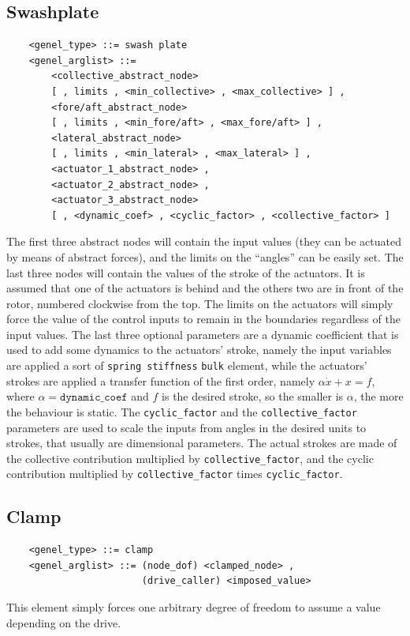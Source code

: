 \subsection{Swashplate}
\begin{verbatim}
    <genel_type> ::= swash plate
    <genel_arglist> ::=
        <collective_abstract_node> 
        [ , limits , <min_collective> , <max_collective> ] ,
        <fore/aft_abstract_node> 
        [ , limits , <min_fore/aft> , <max_fore/aft> ] ,
        <lateral_abstract_node> 
        [ , limits , <min_lateral> , <max_lateral> ] ,
        <actuator_1_abstract_node> ,
        <actuator_2_abstract_node> ,
        <actuator_3_abstract_node> 
        [ , <dynamic_coef> , <cyclic_factor> , <collective_factor> ]
\end{verbatim}
The first three abstract nodes will contain the input values (they can be
actuated by means of abstract forces), and the limits on the ``angles'' can
be easily set. 
The last three nodes will contain the values of the stroke of the actuators.
It is assumed that one of the actuators is behind and the others two are in
front of the rotor, numbered clockwise from the top. 
The limits on the actuators will simply force the value of the control
inputs to remain in the boundaries regardless of the input values.
The last three optional parameters are a dynamic coefficient that is used to
add some dynamics to the actuators' stroke, namely the input variables are
applied a sort of \texttt{spring stiffness} \texttt{bulk} element, while the
actuators' strokes are applied a transfer function of the first order, namely
$ \alpha\dot{x}+x=f $, where $ \alpha=\texttt{dynamic\_coef} $ and $ f $ is
the desired stroke, so the smaller is $ \alpha $, the more the behaviour is
static.
The \texttt{cyclic\_factor} and the \texttt{collective\_factor} parameters are
used to scale the inputs from angles in the desired units to strokes, that
usually are dimensional parameters. The actual strokes are made of the
collective contribution multiplied by \texttt{collective\_factor}, and the
cyclic contribution multiplied by \texttt{collective\_factor} times 
\texttt{cyclic\_factor}.
   
\subsection{Clamp}
\begin{verbatim}
    <genel_type> ::= clamp
    <genel_arglist> ::= (node_dof) <clamped_node> ,
                        (drive_caller) <imposed_value>
\end{verbatim}
This element simply forces one arbitrary degree of freedom to assume a value
depending on the drive.

